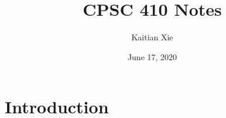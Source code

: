 \documentclass{article}
\title{CPSC 410 Notes}
\author{Kaitian Xie}
\date{June 17, 2020}
\begin{document}
\maketitle
\pagebreak

\section{Introduction}
\end{document}
